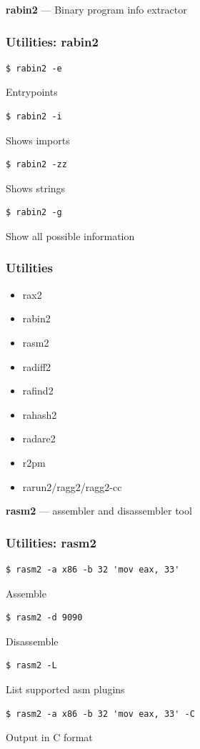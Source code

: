 \documentclass[10pt,pdf,utf8,english,compress,hyperref={unicode}]{beamer}
\begin{document}
\begin{frame}[fragile]
  \center\textbf{rabin2} — Binary program info extractor
  \noindent\makebox[\linewidth]{\rule{\paperwidth}{0.4pt}}
  \frametitle{Utilities: rabin2}
  \begin{verbatim}$ rabin2 -e\end{verbatim}
  \alert{Entrypoints}
  \begin{verbatim}$ rabin2 -i\end{verbatim}
  \alert{Shows imports}
  \begin{verbatim}$ rabin2 -zz\end{verbatim}
  \alert{Shows strings}
  \begin{verbatim}$ rabin2 -g\end{verbatim}
  \alert{Show all possible information}

\end{frame}

\begin{frame}[fragile]
  \frametitle{Utilities}
     \begin{itemize}
        \item rax2
        \item rabin2
        \item \alert{rasm2}
        \item radiff2
        \item rafind2
        \item rahash2
        \item radare2
        \item r2pm
        \item rarun2/ragg2/ragg2-cc
      \end{itemize}
\end{frame}

\begin{frame}[fragile]
  \center\textbf{rasm2} — assembler and disassembler tool
  \noindent\makebox[\linewidth]{\rule{\paperwidth}{0.4pt}}
  \frametitle{Utilities: rasm2}
  \begin{verbatim}$ rasm2 -a x86 -b 32 'mov eax, 33'\end{verbatim}
  \alert{Assemble}
  \begin{verbatim}$ rasm2 -d 9090\end{verbatim}
  \alert{Disassemble}
  \begin{verbatim}$ rasm2 -L\end{verbatim}
  \alert{List supported asm plugins}
  \begin{verbatim}$ rasm2 -a x86 -b 32 'mov eax, 33' -C\end{verbatim}
  \alert{Output in C format}

\end{frame}
\end{document}

